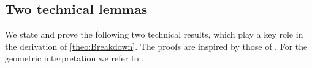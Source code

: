 \documentclass[11pt]{article}
\theoremstyle{plain}
\theoremstyle{definition}\newtheorem{definition}[theorem]{Definition}
\theoremstyle{remark}
\begin{document}
\subsection{Two technical lemmas}
We state and prove the following two technical results, which play a key role in the derivation of \cref{theo:Breakdown}. 
The proofs are inspired by those of \cite[Lemmas~3.2 and~3.3]{delBarrioGonzalezLoubes.24}. For the geometric interpretation we refer to . 

\begin{figure}[h!]
    \centering
    

\begin{tikzpicture}[x=0.75pt,y=0.75pt,yscale=-0.8,xscale=0.8]
%


\end{tikzpicture}
\end{figure}
\end{document}
